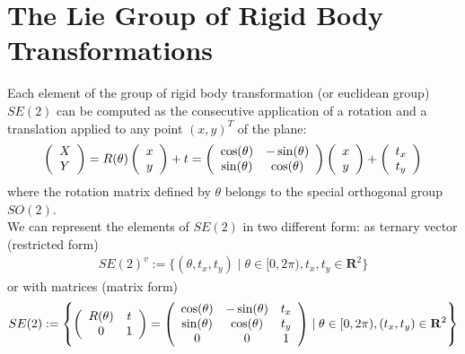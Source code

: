 \section{The Lie Group of Rigid Body Transformations}\label{se:rigid_body_transformations}
Each element of the group of rigid body transformation (or euclidean group) $SE(2)$ can be computed as the consecutive application of a rotation and a translation applied to any point $(x,y)^T$ of the plane:
\begin{align*}
\left (  
\begin{array} {c }
X \\
Y
\end{array}
\right )  
= 
R(\theta)
\left (  
\begin{array} {c }
x \\
y
\end{array}
\right ) 
+
t
=
\left (
\begin{array} {c c }
\cos(\theta) & - \sin(\theta) \\
\sin(\theta) & \cos(\theta) 
\end{array}
\right )
\left (  
\begin{array} {c }
x \\
y
\end{array}
\right ) 
+
\left (  
\begin{array} {c }
t_x \\
t_y
\end{array}
\right ) 
\end{align*}
where the rotation matrix defined by $\theta$ belongs to the special orthogonal group $SO(2)$.\\
We can represent the elements of $SE(2)$ in two different form: as ternary vector (restricted form) 
\begin{align*}
SE(2)^{v} 
:=
\{ (\theta, t_x, t_y) \mid \theta \in [0, 2\pi),   t_x, t_y \in\mathbf{R}^2  \}
\end{align*}
or with matrices (matrix form)
\begin{align*}
SE(2) 
:= 
\left \{
\left (
\begin{array} {c c }
R(\theta) & t \\
0 & 1 
\end{array}
\right )
=
\left (
\begin{array} {c c c }
\cos(\theta) & - \sin(\theta)& t_{x} \\
\sin(\theta) & \cos(\theta) & t_{y}\\
0 & 0 &  1
\end{array}
\right )
\mid
\theta \in  [0, 2\pi), (t_x, t_y) \in\mathbf{R}^2
\right \}
\end{align*}
